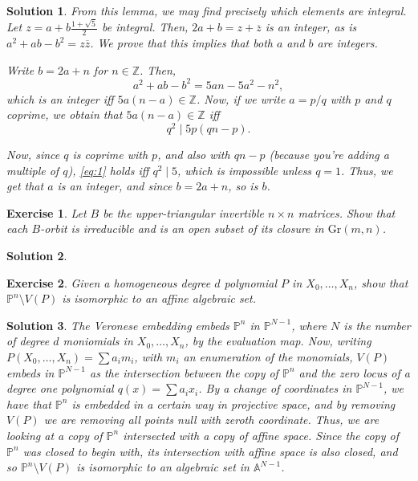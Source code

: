 \documentclass{article}
\newtheorem{ex}{Exercise}
\theoremstyle{nonumberplain}
\newtheorem{sol}{Solution}
\newcommand{\Z}{\mathbb{Z}}
\newcommand{\PP}{\mathbb{P}}
\newcommand{\Aff}{\mathbb{A}}
\newcommand{\Gr}{\mathrm{Gr}}
\newcommand{\conj}[1]{\overline{#1}}
\begin{document}
\begin{sol}
From this lemma, we may find precisely which elements are integral. Let $z = a + b \frac{1+\sqrt5}2$ be integral. Then, $2a+b = z + \conj z$ is an integer, as is $a^2 + ab - b^2 = z \conj z$. We prove that this implies that both $a$ and $b$ are integers.

Write $b = 2a + n$ for $n \in \Z$. Then,
\begin{equation}
a^2 + ab - b^2 = 5an - 5a^2 - n^2,
\end{equation}
which is an integer iff $5a(n-a) \in \Z$. Now, if we write $a = p/q$ with $p$ and $q$ coprime, we obtain that $5a(n-a) \in \Z$ iff
\begin{equation}\label{eq:1}
q^2 \mid 5p(qn-p).
\end{equation}

Now, since $q$ is coprime with $p$, and also with $qn-p$ (because you're adding a multiple of $q$), \eqref{eq:1} holds iff $q^2 \mid 5$, which is impossible unless $q = 1$. Thus, we get that $a$ is an integer, and since $b = 2a + n$, so is $b$.
\end{sol}

\begin{ex}
Let $B$ be the upper-triangular invertible $n \times n$ matrices. Show that each $B$-orbit is irreducible and is an open subset of its closure in $\Gr(m,n)$.
\end{ex}

\begin{sol}

\end{sol}

\begin{ex}
Given a homogeneous degree $d$ polynomial $P$ in $X_0, \dots, X_n$, show that $\PP^n \setminus V(P)$ is isomorphic to an affine algebraic set.
\end{ex}

\begin{sol}
The Veronese embedding embeds $\PP^n$ in $\PP^{N-1}$, where $N$ is the number of degree $d$ moniomials in $X_0, \dots, X_n$, by the evaluation map. Now, writing $P(X_0, \dots, X_n) = \sum a_i m_i$, with $m_i$ an enumeration of the monomials, $V(P)$ embeds in $\PP^{N-1}$ as the intersection between the copy of $\PP^n$ and the zero locus of a degree one polynomial $q(x) = \sum a_i x_i$. By a change of coordinates in $\PP^{N-1}$, we have that $\PP^n$ is embedded in a certain way in projective space, and by removing $V(P)$ we are removing all points null with zeroth coordinate. Thus, we are looking at a copy of $\PP^n$ intersected with a copy of affine space. Since the copy of $\PP^n$ was closed to begin with, its intersection with affine space is also closed, and so $\PP^n \setminus V(P)$ is isomorphic to an algebraic set in $\Aff^{N-1}$.

\end{sol}
\end{document}
